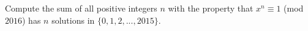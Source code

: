Compute the sum of all positive integers $n$ with the property that $x^n \equiv 1$ (mod $2016$) has $n$ solutions in $\{0, 1, 2, ... , 2015\}$.